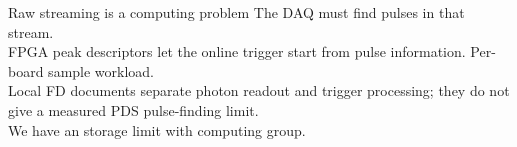 \begin{frame}{Raw streaming is a computing problem}
    {The DAQ must find pulses in that stream.\\ FPGA peak descriptors let the online trigger start from pulse information.}
  {Per-board sample workload. \\Local FD documents separate photon readout and trigger processing; they do not give a measured PDS pulse-finding limit. \\ We have an storage limit with computing group.}
\end{frame}

